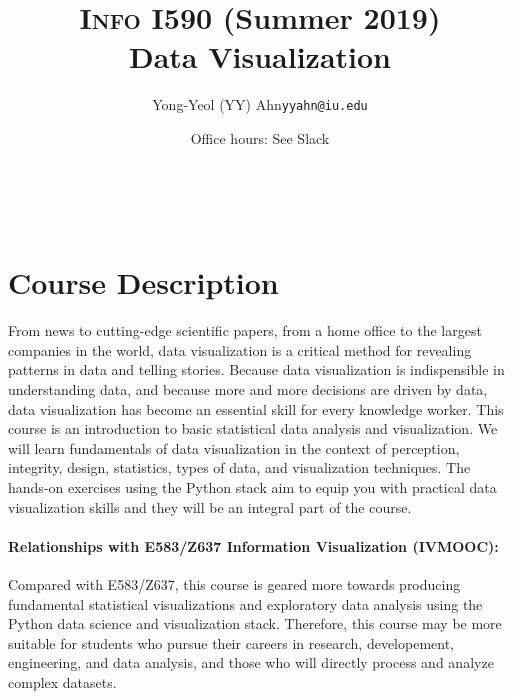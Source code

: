 \documentclass[11pt,article,oneside]{memoir} %
\makeatletter
\def\myauthor{Author}
\def\mytitle{Title}
\def\myemail{yyahn@iu.edu}
\def\myauthor{Yong-Yeol (YY) Ahn}
\def\mytitle{{\normalsize \textsc{Info} I590 (Summer 2019)} \\ \HUGE{} Data Visualization}
\makeatother
\begin{document}

\title{\LARGE \mytitle} %
\author{\Large\myauthor\newline \footnotesize\texttt{\noindent\myemail}}

\maketitle 

\vspace{-20pt}{\bfseries Assistant Instructors: TBD} \\ 

\date{Office hours: See Slack}
\section{Course Description}%

From news to cutting-edge scientific papers, from a home office to the largest companies in the world, data visualization is a critical method for revealing patterns in data and telling stories. 
Because data visualization is indispensible in understanding data, and because more and more decisions are driven by data, data visualization has become an essential skill for every knowledge worker.  
This course is an introduction to basic statistical data analysis and visualization.  
We will learn fundamentals of data visualization in the context of perception, integrity, design, statistics, types of data, and visualization techniques.  
The hands-on exercises using the Python stack aim to equip you with practical data visualization skills and they will be an integral part of the course. 

\paragraph{Relationships with E583/Z637 Information Visualization (IVMOOC):}
Compared with E583/Z637, this course is geared more towards producing fundamental statistical visualizations and exploratory data analysis using the Python data science and visualization stack.  
Therefore, this course may be more suitable for students who pursue their careers in research, developement, engineering, and data analysis, and those who will directly process and analyze complex datasets. 
\end{document}
